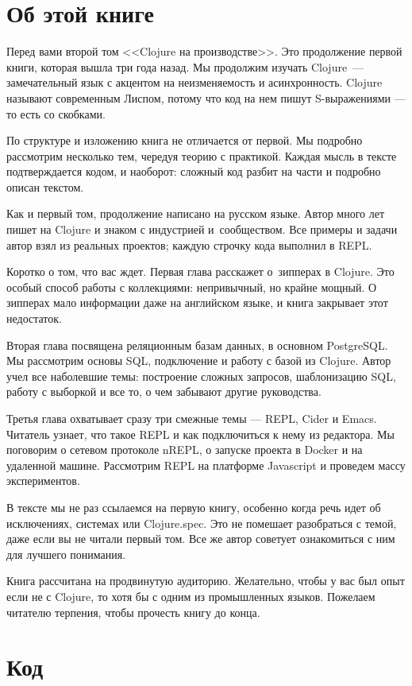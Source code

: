 
\section*{Об этой книге}

Перед вами второй том <<Clojure на производстве>>. Это продолжение первой книги,
которая вышла три года назад. Мы продолжим изучать Clojure~--- замечательный язык
с акцентом на неизменяемость и асинхронность. Clojure называют современным
Лиспом, потому что код на нем пишут S-выражениями — то есть со скобками.

По структуре и изложению книга не отличается от первой. Мы подробно рассмотрим
несколько тем, чередуя теорию с практикой. Каждая мысль в тексте подтверждается
кодом, и наоборот: сложный код разбит на части и подробно описан текстом.

Как и первый том, продолжение написано на русском языке. Автор много лет пишет
на Clojure и знаком с индустрией и~сообществом. Все примеры и задачи автор взял
из реальных проектов; каждую строчку кода выполнил в REPL.

Коротко о том, что вас ждет. Первая глава расскажет о~зипперах в Clojure. Это
особый способ работы с коллекциями: непривычный, но крайне мощный. О зипперах
мало информации даже на английском языке, и книга закрывает этот недостаток.

Вторая глава посвящена реляционным базам данных, в основном PostgreSQL. Мы
рассмотрим основы SQL, подключение и работу с базой из Clojure. Автор учел все
наболевшие темы: построение сложных запросов, шаблонизацию SQL, работу с
выборкой и все то, о чем забывают другие руководства.

Третья глава охватывает сразу три смежные темы — REPL, Cider и Emacs. Читатель
узнает, что такое REPL и как подключиться к нему из редактора. Мы поговорим о
сетевом протоколе nREPL, о запуске проекта в Docker и на удаленной
машине. Рассмотрим REPL на платформе Javascript и проведем массу экспериментов.

В тексте мы не раз ссылаемся на первую книгу, особенно когда речь идет об
исключениях, системах или Clojure.spec. Это не помешает разобраться с темой,
даже если вы не читали первый том. Все же автор советует ознакомиться с ним для
лучшего понимания.

Книга рассчитана на продвинутую аудиторию. Желательно, чтобы у вас был опыт если
не с Clojure, то хотя бы с одним из промышленных языков. Пожелаем читателю
терпения, чтобы прочесть книгу до конца.

\section*{Код}

